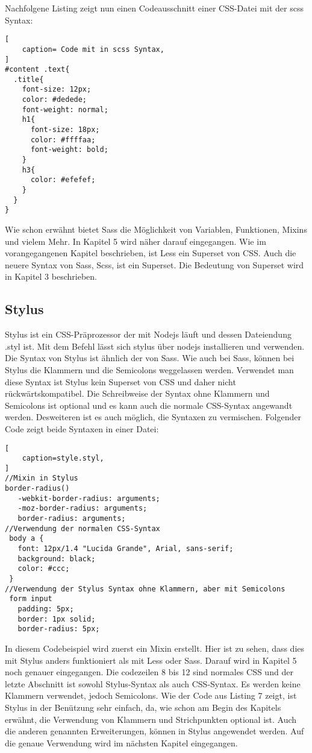 Nachfolgene Listing zeigt nun einen Codeausschnitt einer CSS-Datei mit der scss Syntax:
\begin{lstlisting}[
	caption= Code mit in scss Syntax,
]
#content .text{
  .title{
    font-size: 12px;
    color: #dedede;
    font-weight: normal;
    h1{
      font-size: 18px;
      color: #ffffaa;
      font-weight: bold;
    }
    h3{
      color: #efefef;
    }
  }
}
\end{lstlisting}

Wie schon erwähnt bietet Sass die Möglichkeit von Variablen, Funktionen, Mixins und vielem Mehr.
In Kapitel 5 wird näher darauf eingegangen. Wie im vorangegangenen Kapitel beschrieben, ist Less ein Superset von CSS. Auch die neuere Syntax von Sass, Scss, ist ein Superset. Die Bedeutung von Superset wird in Kapitel 3 beschrieben.
\newpage
\subsection{Stylus}
Stylus ist ein CSS-Präprozessor der mit Nodejs läuft und dessen Dateiendung .styl ist.\newline
Mit dem Befehl \glqq{} lässt sich stylus über nodejs installieren und verwenden. \newline
Die Syntax von Stylus ist ähnlich der von Sass. Wie auch bei Sass, können bei Stylus die Klammern und die Semicolons weggelassen werden.
Verwendet man diese Syntax ist Stylus kein Superset von CSS und daher nicht rückwärtskompatibel.\newline
Die Schreibweise der Syntax ohne Klammern und Semicolons ist optional und es kann auch die normale CSS-Syntax angewandt werden.\newline
Desweiteren ist es auch möglich, die Syntaxen zu vermischen. Folgender Code zeigt beide Syntaxen in einer Datei:
\begin{lstlisting}[
	caption=style.styl,
]
//Mixin in Stylus
border-radius()
   -webkit-border-radius: arguments;
   -moz-border-radius: arguments;
   border-radius: arguments;
//Verwendung der normalen CSS-Syntax
 body a {
   font: 12px/1.4 "Lucida Grande", Arial, sans-serif;
   background: black;
   color: #ccc;
 }
//Verwendung der Stylus Syntax ohne Klammern, aber mit Semicolons
 form input
   padding: 5px;
   border: 1px solid;
   border-radius: 5px;
\end{lstlisting}
\autocite[]{LearnBoost.2010}\newline

In diesem Codebeispiel wird zuerst ein Mixin erstellt. Hier ist zu sehen, dass dies mit Stylus anders funktioniert als mit Less oder Sass. Darauf wird in Kapitel 5 noch genauer eingegangen.\newline
Die codezeilen 8 bis 12 sind normales CSS und der letzte Abschnitt ist sowohl Stylus-Syntax als auch CSS-Syntax. Es werden keine Klammern verwendet, jedoch Semicolons.\newline
Wie der Code aus Listing 7 zeigt, ist Stylus in der Benützung sehr einfach, da, wie schon am Begin des Kapitels erwähnt, die Verwendung von Klammern und Strichpunkten optional ist. Auch die anderen genannten Erweiterungen, können in Stylus angewendet werden.\newline
Auf die genaue Verwendung wird im nächsten Kapitel eingegangen.
